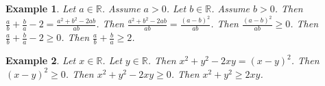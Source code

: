 \documentclass[12pt]{article}
\newtheorem{example}{Example}
\begin{document}
\begin{example}
    Let $a\in\mathbb{R}$. Assume $a > 0$.
    Let $b\in\mathbb{R}$. Assume $b > 0$.
    Then $\frac{a}{b} + \frac{b}{a} - 2 = \frac{a^2 + b^2 - 2ab}{ab}$.
    Then $\frac{a^2 + b^2 - 2ab}{ab} = \frac{{(a-b)}^2}{ab}$.
    Then $\frac{{(a-b)}^2}{ab} \ge 0$.
    Then $\frac{a}{b} + \frac{b}{a} - 2 \ge 0$.
    Then $\frac{a}{b} + \frac{b}{a} \ge 2$.
\end{example}

\begin{example}
    Let $x\in\mathbb{R}$. Let $y\in\mathbb{R}$.
    Then $x^2 + y^2 - 2xy = {(x-y)}^2$.
    Then ${(x-y)}^2 \ge 0$.
    Then $x^2 + y^2 - 2xy \ge 0$.
    Then $x^2 + y^2 \ge 2xy$.
\end{example}
\end{document}
